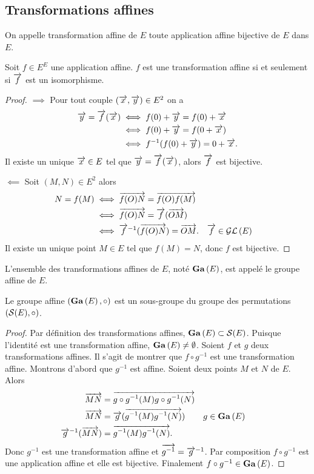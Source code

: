 \subsection{Transformations affines}

\begin{defdef}
  On appelle transformation affine de $E$ toute application affine bijective de $E$ dans $E$.
\end{defdef}
\begin{prop}
  Soit $f \in E^E$ une application affine. $f$ est une transformation affine si et seulement si $\vect{f}$ est un isomorphisme.
\end{prop}
\begin{proof}
  $\implies$ Pour tout couple $(\vx, \vy)\in E^2$ on a
  \begin{align}
    \vy= \vect{f}(\vx) &\iff f(0)+\vy = f(0)+\vx \\
    &\iff f(0)+\vy = f(0+\vx)\\
    &\iff f^{-1}(f(0)+\vy)=0+\vx.
  \end{align}
  Il existe un unique $\vx \in E$ tel que $\vy=\vect{f}(\vx)$, alors $\vect{f}$ est bijective.

  $\impliedby$ Soit $(M, N) \in E^2$ alors
  \begin{align}
    N = f(M) &\iff \vect{f(O)N} = \vect{f(O)f(M)} \\
    &\iff \vect{f(O)N} = \vect{f}(\vect{OM}) \\
    &\iff \vect{f}^{-1}(\vect{f(O)N}) = \vect{OM}. && \vect{f} \in \GL{E}\\
  \end{align}
  Il existe un unique point $M \in E$ tel que $f(M)=N$, donc $f$ est bijective.
\end{proof}
%
\begin{defdef}
  L'ensemble des transformations affines de $E$, noté $\Ga{E}$, est appelé le groupe affine de $E$.
\end{defdef}
\begin{prop}
  Le groupe affine $(\Ga{E}, \circ)$ est un sous-groupe du groupe des permutations $(\S(E), \circ)$.
\end{prop}
\begin{proof}
  Par définition des transformations affines, $\Ga{E} \subset \S(E)$. Puisque l'identité est une transformation affine, $\Ga{E} \neq \emptyset$. Soient $f$ et $g$ deux transformations affines. Il s'agit de montrer que $f \circ g^{-1}$ est une transformation affine. Montrons d'abord que $g^{-1}$ est affine. Soient deux points $M$ et $N$ de $E$. Alors
  \begin{align}
    \vect{MN} &= \vect{g\circ g^{-1}(M) g\circ g^{-1}(N)} \\
    \vect{MN} &=\vect{g} (\vect{g^{-1}(M) g^{-1}(N)}) && g \in \Ga{E}\\
    \vect{g}^{-1}(\vect{MN}) &= \vect{g^{-1}(M) g^{-1}(N)}.
  \end{align}
  Donc $g^{-1}$ est une transformation affine et $\vect{g^{-1}} = \vect{g}^{-1}$. Par composition $f \circ g^{-1}$ est une application affine et elle est bijective. Finalement $f \circ g^{-1} \in \Ga{E}$.
\end{proof}

